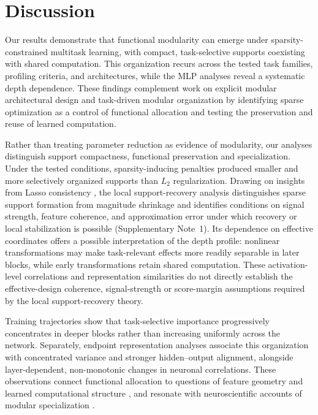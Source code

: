 \documentclass{article}
\begin{document}
\clearpage
\section{Discussion}

Our results demonstrate that functional modularity can emerge under sparsity-constrained multitask learning, with compact, task-selective supports coexisting with shared computation. This organization recurs across the tested task families, profiling criteria, and architectures, while the MLP analyses reveal a systematic depth dependence. These findings complement work on explicit modular architectural design \cite{andreasNeuralModuleNetworks2017,sunModularityDeepLearning2023} and task-driven modular organization \cite{wu2026taskstructured} by identifying sparse optimization as a control of functional allocation and testing the preservation and reuse of learned computation.

Rather than treating parameter reduction as evidence of modularity, our analyses distinguish support compactness, functional preservation and specialization. Under the tested conditions, sparsity-inducing penalties produced smaller and more selectively organized supports than \(L_{2}\) regularization. Drawing on insights from Lasso consistency \cite{zhaoModelSelectionConsistency}, the local support-recovery analysis distinguishes sparse support formation from magnitude shrinkage and identifies conditions on signal strength, feature coherence, and approximation error under which recovery or local stabilization is possible (Supplementary Note~1). Its dependence on effective coordinates offers a possible interpretation of the depth profile: nonlinear transformations may make task-relevant effects more readily separable in later blocks, while early transformations retain shared computation. These activation-level correlations and representation similarities do not directly establish the effective-design coherence, signal-strength or score-margin assumptions required by the local support-recovery theory.

Training trajectories show that task-selective importance progressively concentrates in deeper blocks rather than increasing uniformly across the network. Separately, endpoint representation analyses associate this organization with concentrated variance and stronger hidden--output alignment, alongside layer-dependent, non-monotonic changes in neuronal correlations. These observations connect functional allocation to questions of feature geometry \cite{liGeometryConceptsSparse2024} and learned computational structure \cite{cagnettaTheoryHowStructure2024,chughtaiToyModelUniversality2023}, and resonate with neuroscientific accounts of modular specialization \cite{damicelliTopologicalReinforcementPrinciple2019}.
\end{document}
